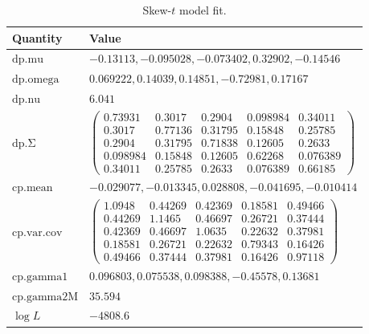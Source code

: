 \begin{table}[ht]
\centering
\begin{tabular}{ll}
\toprule
Quantity & Value \\
\midrule
$\mathrm{dp.mu}$ & $-0.13113, -0.095028, -0.073402, 0.32902, -0.14546$ \\
$\mathrm{dp.omega}$ & $0.069222, 0.14039, 0.14851, -0.72981, 0.17167$ \\
$\mathrm{dp.nu}$ & $6.041$ \\
$\mathrm{dp.\Sigma}$ & $\begin{pmatrix}0.73931 & 0.3017 & 0.2904 & 0.098984 & 0.34011\\0.3017 & 0.77136 & 0.31795 & 0.15848 & 0.25785\\0.2904 & 0.31795 & 0.71838 & 0.12605 & 0.2633\\0.098984 & 0.15848 & 0.12605 & 0.62268 & 0.076389\\0.34011 & 0.25785 & 0.2633 & 0.076389 & 0.66185\end{pmatrix}$ \\
$\mathrm{cp.mean}$ & $-0.029077, -0.013345, 0.028808, -0.041695, -0.010414$ \\
$\mathrm{cp.var.cov}$ & $\begin{pmatrix}1.0948 & 0.44269 & 0.42369 & 0.18581 & 0.49466\\0.44269 & 1.1465 & 0.46697 & 0.26721 & 0.37444\\0.42369 & 0.46697 & 1.0635 & 0.22632 & 0.37981\\0.18581 & 0.26721 & 0.22632 & 0.79343 & 0.16426\\0.49466 & 0.37444 & 0.37981 & 0.16426 & 0.97118\end{pmatrix}$ \\
$\mathrm{cp.gamma1}$ & $0.096803, 0.075538, 0.098388, -0.45578, 0.13681$ \\
$\mathrm{cp.gamma2M}$ & $35.594$ \\
$\log L$ & $-4808.6$ \\
\bottomrule
\end{tabular}
\caption{Skew-$t$ model fit.}
\label{optimal_table}
\end{table}